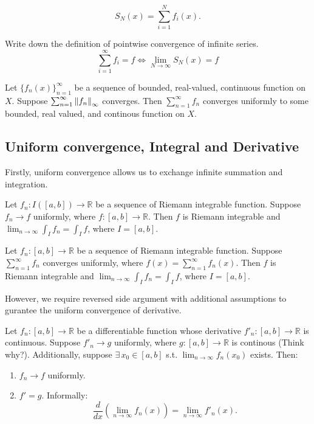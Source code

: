 \documentclass[12pt]{article}
\begin{document}
\begin{definition}
    \[S_N(x)=\sum_{i=1}^{N}f_i(x).\]
\end{definition}

\begin{exercise}
    Write down the definition of pointwise convergence of infinite series.
    \[\sum_{i=1}^{\infty}f_i=f \Longleftrightarrow \lim_{N\rightarrow\infty}S_N(x)=f\]
\end{exercise}


\begin{theorem}
   Let $\{f_n(x)\}^\infty_{n=1}$ be a sequence of bounded, real-valued, continuous function on $X$.
   Suppose $\sum_{n=1}^{\infty}\left\lVert f_n \right\rVert_\infty$ converges. Then $\sum_{n=1}^{\infty}f_n$ converges uniformly to some bounded, real valued, and continous function on $X$.
\end{theorem}


\subsection*{Uniform convergence, Integral and Derivative}
Firstly, uniform convergence allows us to exchange infinite summation and integration.

\begin{theorem}
Let $f_n:I([a,b])\rightarrow\mathbb{R}$ be a sequence of Riemann integrable function.
Suppose $f_n\rightarrow f$ uniformly, where $f:[a,b]\rightarrow\mathbb{R}$.
Then $f$ is Riemann integrable and $\lim_{n\rightarrow\infty}\int_{I}f_n = \int_{I}f$, where $I=[a,b].$   
\end{theorem}

\begin{corollary}
Let $f_n:[a,b]\rightarrow\mathbb{R}$ be a sequence of Riemann integrable function.
Suppose $\sum_{n=1}^{\infty}f_n$ converges uniformly, where $f(x)=\sum_{n=1}^{\infty}f_n(x)$.
Then $f$ is Riemann integrable and $\lim_{n\rightarrow\infty}\int_{I}f_n = \int_{I}f$, where $I=[a,b].$   
\end{corollary}

However, we require reversed side argument with additional assumptions to gurantee the uniform convergence of derivative.

\begin{theorem}
    Let $f_n:[a,b]\rightarrow\mathbb{R}$ be a differentiable function whose derivative $f'_n:[a,b]\rightarrow\mathbb{R}$ is continuous.
    Suppose $f'_n\rightarrow g$ uniformly, where $g:[a,b]\rightarrow\mathbb{R}$ is continous (Think why?).
    Additionally, suppose $\exists\, x_0\in [a,b]$ s.t. $\lim_{n\rightarrow\infty}f_n(x_0)$ exists.
    Then:
    \begin{enumerate}
        \item $f_n\rightarrow f$ uniformly.
        \item $f'=g.$ Informally:
        \[\frac{d}{dx}(\lim_{n\rightarrow\infty}f_n(x))= \lim_{n\rightarrow\infty}f'_n(x).\]
    \end{enumerate}
\end{theorem}
\end{document}
